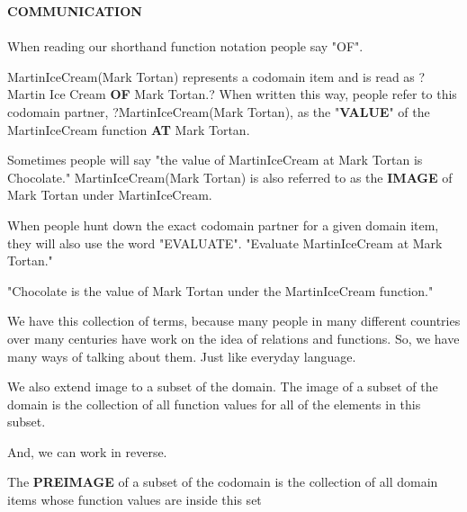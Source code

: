 \documentclass{ximera}
\begin{document}
\begin{remark} \textbf{COMMUNICATION} \\
\quad \\
When reading our shorthand function notation people say "OF".

MartinIceCream(Mark Tortan) represents a codomain item and is read as ?Martin Ice Cream \textbf{OF} Mark Tortan.? When written this way, people refer to this codomain partner,
?MartinIceCream(Mark Tortan), as the "\textbf{VALUE}" of the MartinIceCream function \textbf{AT} Mark Tortan.

Sometimes people will say "the value of MartinIceCream at Mark Tortan is Chocolate."
MartinIceCream(Mark Tortan) is also referred to as the \textbf{IMAGE} of Mark Tortan under MartinIceCream.

When people hunt down the exact codomain partner for a given domain item, they will also use the word "EVALUATE".
"Evaluate MartinIceCream at Mark Tortan."

"Chocolate is the value of Mark Tortan under the MartinIceCream function."

We have this collection of terms, because many people in many different countries over many centuries have work on the idea of relations and functions.  So, we have many ways of talking about them. Just like everyday language.

We also extend image to a subset of the domain.  The image of a subset of the domain is the collection of all function values for all of the elements in this subset.

And, we can work in reverse.

The \textbf{PREIMAGE} of a subset of the codomain is the collection of all domain items whose function values are inside this set


\end{remark}
\quad \\
\end{document}
